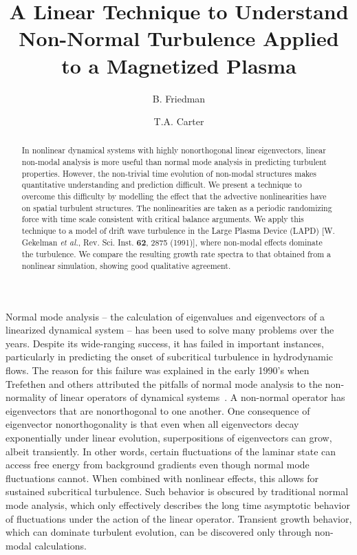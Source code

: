 \documentclass[letter,scriptaddress,twocolumn, prl,showkeys]{revtex4}
\begin{document}
\title{A Linear Technique to Understand Non-Normal Turbulence Applied to a Magnetized Plasma}

\author{B. Friedman}

\author{T.A. Carter}




\begin{abstract}
In nonlinear dynamical systems with highly nonorthogonal linear eigenvectors, linear non-modal analysis is more useful than normal mode analysis in predicting turbulent properties. 
However, the non-trivial time evolution of non-modal structures makes quantitative understanding and prediction difficult. 
We present a technique to overcome this difficulty by modelling the effect that the advective nonlinearities have on spatial turbulent structures. The nonlinearities are taken as a periodic randomizing force with
time scale consistent with critical balance arguments. We apply this technique to a model of drift wave turbulence in the Large Plasma Device (LAPD) 
[W. Gekelman \emph{et al.}, Rev. Sci. Inst. {\bf 62}, 2875 (1991)], where non-modal effects dominate the turbulence.
We compare the resulting growth rate spectra to that obtained from a nonlinear simulation, showing good qualitative agreement.
\end{abstract}

\maketitle

Normal mode analysis -- the calculation of eigenvalues and eigenvectors of a linearized dynamical system -- has been used to solve many problems over the years.
Despite its wide-ranging success, it has failed in important instances, particularly in predicting the onset of subcritical turbulence in hydrodynamic flows. 
The reason for this failure was explained in the early 1990's when Trefethen and others attributed the pitfalls of normal mode analysis to the non-normality of linear operators of
dynamical systems~\cite{trefethen1993,schmid2007}. A non-normal operator has 
eigenvectors that are nonorthogonal to one another. One consequence of eigenvector nonorthogonality is that even when all eigenvectors decay exponentially under linear evolution, 
superpositions of eigenvectors can grow, albeit transiently.
In other words, certain fluctuations of the laminar state can access free energy from background gradients even though normal mode fluctuations cannot.
When combined with nonlinear effects, this allows for sustained subcritical turbulence.
Such behavior is obscured by traditional normal mode analysis, which only effectively describes the long time asymptotic behavior of fluctuations under the 
action of the linear operator. Transient growth behavior, which can dominate turbulent evolution, can be discovered only through non-modal calculations.
\end{document}
